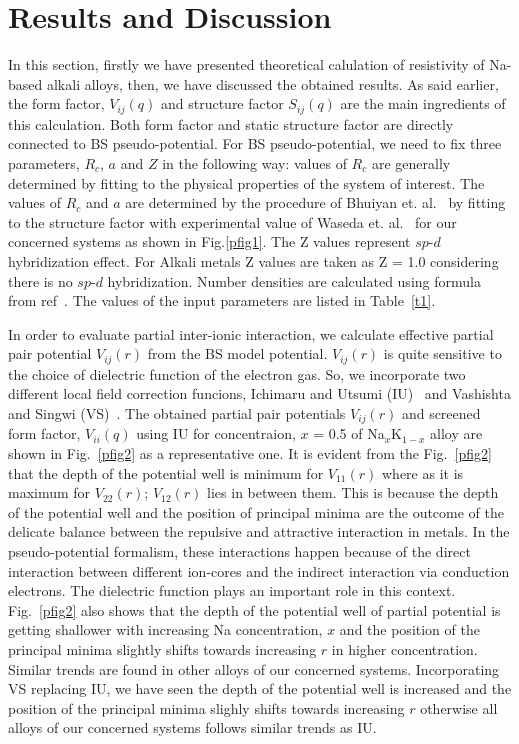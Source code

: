 \documentclass[final12pt]{elsarticle}
\begin{document}
\section{Results and Discussion}
\label{res}
In this section, firstly we have presented theoretical calulation of resistivity of Na-based alkali alloys, then, we have discussed the obtained results. As said earlier, the form factor, $V_{ij}(q)$ and structure factor $S_{ij}(q)$ are the main ingredients of this calculation. Both form factor and static structure factor are directly connected to BS pseudo-potential. For BS pseudo-potential, we need to fix three parameters, $R_c$, $a$ and $Z$ in the following way: values of $R_c$ are generally determined by fitting to the physical properties of the system of interest. The values of $R_c$ and $a$ are determined by the procedure of Bhuiyan et. al.~\cite{Bhuiyan1993} by fitting to the structure factor with experimental value of Waseda et. al.~\cite{Waseda} for our concerned systems as shown in Fig.\ref{pfig1}. The Z values represent $sp$-$d$ hybridization effect. For Alkali metals Z values are taken as Z = 1.0 considering there is no $sp$-$d$ hybridization. Number densities are calculated using formula from ref~\cite{Smithells}. The values of the input parameters are listed in Table~\ref{t1}. 

In order to evaluate partial inter-ionic interaction, we calculate effective partial pair potential $V_{ij}(r)$ from the BS model potential. $V_{ij}(r)$ is quite sensitive to the choice of dielectric function of the electron gas. So, we incorporate two different local field correction funcions, Ichimaru and Utsumi (IU)~\cite{ichimaru} and Vashishta and Singwi (VS)~\cite{Vashishta1972}. The obtained partial pair potentials $V_{ij}(r)$ and screened form factor, $V_{ii}(q)$ using IU for concentraion, $x$ = 0.5 of Na$_x$K$_{1-x}$ alloy are shown in Fig.~\ref{pfig2} as a representative one. It is evident from the Fig.~\ref{pfig2} that the depth of the potential well is minimum for $V_{11}(r)$ where as it is maximum for $V_{22}(r)$; $V_{12}(r)$ lies in between them. This is because the depth of the potential well and the position of principal minima are the outcome of the delicate balance between the repulsive and attractive interaction in metals. In the pseudo-potential formalism, these interactions happen because of the direct interaction between different ion-cores and the indirect interaction via conduction electrons. The dielectric function plays an important role in this context. Fig.~\ref{pfig2} also shows that the depth of the potential well of partial potential is getting shallower with increasing Na concentration, $x$ and the position of the principal minima slightly shifts towards increasing $r$ in higher concentration. Similar trends are found in other alloys of our concerned systems. Incorporating VS replacing IU, we have seen the depth of the potential well is increased and the position of the principal minima slighly shifts towards increasing $r$ otherwise all alloys of our concerned systems follows similar trends as IU. 
\end{document}

